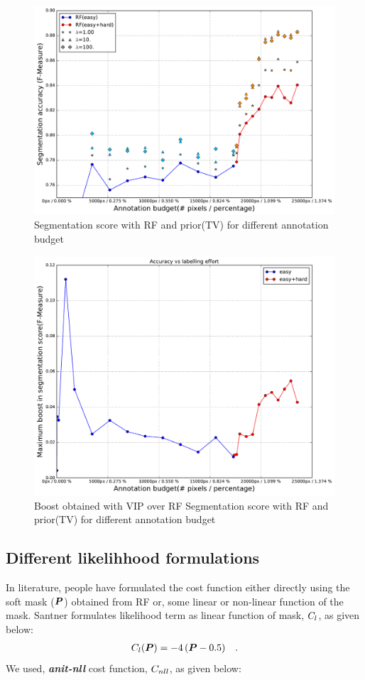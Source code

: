 \begin{figure}[h!] \label{fig:rf_vip}
 \includegraphics[width=1.0\linewidth]{figures/rf_vip_easy_then_hard.pdf}
\caption{Segmentation score with RF and prior(TV) for different annotation budget}
\end{figure}


\begin{figure}[h!] \label{fig:rf_vip1}
 \includegraphics[width=1.0\linewidth]{figures/vip_boost.pdf}
\caption{Boost obtained with VIP over RF Segmentation score with RF and prior(TV) for different annotation budget}
\end{figure}

\subsection{Different likelihhood formulations}
In literature, people have formulated the cost function either directly using the soft mask ($\boldsymbol{P}$) obtained from RF or, some linear or non-linear function of the mask. Santner \cite{santner:2009} formulates likelihood term as linear function of mask, $\mathop{{}C_l}$, as given below:
\begin{align*}
\mathop{{}C_l}(\boldsymbol{P}) = -4\,(\boldsymbol{P}-0.5) \quad .
\end{align*}
We used, \textbf{\textit{anit-nll}} cost function, $\mathop{{}C_{nll}}$, as given below:

